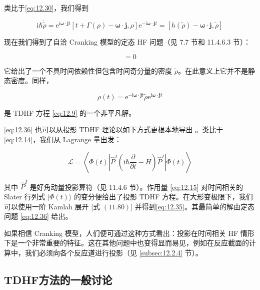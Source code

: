 类比于\ref{eq:12.30}，我们得到

\begin{equation}
\mathrm{i}\hbar\dot{\tilde{\rho}}=\mathrm{e}^{\mathrm{i}\boldsymbol{\omega}\cdot\boldsymbol{j}t}[t+\Gamma(\rho)-\boldsymbol{\omega}\cdot\boldsymbol{j},\rho]\mathrm{e}^{-\mathrm{i}\boldsymbol{\omega}\cdot\boldsymbol{j}t}=[h(\tilde{\rho})-\boldsymbol{\omega}\cdot\boldsymbol{j},\tilde{\rho}]\label{eq:12.35}
\end{equation}

现在我们得到了自洽 Cranking 模型的定态 HF 问题（见 7.7 节和 11.4.6.3 节）：

\begin{equation}
[h(\tilde{\rho})-\boldsymbol{\omega}\cdot\boldsymbol{j},\tilde{\rho}]=0\label{eq:12.36}
\end{equation}

它给出了一个不具时间依赖性但包含时间奇分量的密度 $\tilde{\rho}$。在此意义上它并不是静态密度。同样，

\begin{equation}
\rho(t)=\mathrm{e}^{-\mathrm{i}\boldsymbol{\omega}\cdot\boldsymbol{j}t}\tilde{\rho}\mathrm{e}^{\mathrm{i}\boldsymbol{\omega}\cdot\boldsymbol{j}t}\label{eq:12.37}
\end{equation}

是 TDHF 方程 \ref{eq:12.9} 的一个非平凡解。

\ref{eq:12.36} 也可以从投影 TDHF 理论以如下方式更根本地导出 \cite{EMR80b}。类比于\ref{eq:12.14}，我们从
Lagrange 量出发：

\[
\mathcal{L}=\left\langle \Phi(t)\left|\hat{P}^{I}\left(\mathrm{i}\hbar\frac{\partial}{\partial t}-H\right)\hat{P}^{I}\right|\Phi(t)\right\rangle 
\]

其中 $\hat{P}^{I}$ 是好角动量投影算符（见 11.4.6 节）。作用量 \ref{eq:12.15} 对时间相关的
Slater 行列式 $|\Phi(t)\rangle$ 的变分便给出了投影 TDHF 方程。在大形变极限下，我们可以使用一阶 Kamlah
展开 {[}式 $(11.80)${]} 并得到\ref{eq:12.35}。其最简单的解由定态问题 \ref{eq:12.36}
给出。

如果相信 Cranking 模型，人们便可通过这种方式看出：投影在时间相关 HF 情形下是一个非常重要的特征。这在其他问题中也变得显而易见，例如在反应截面的计算中，我们必须向各个反应道进行投影（见
\ref{subsec:12.2.4} 节）。

\subsection{TDHF方法的一般讨论\label{subsec:12.2.4}}

